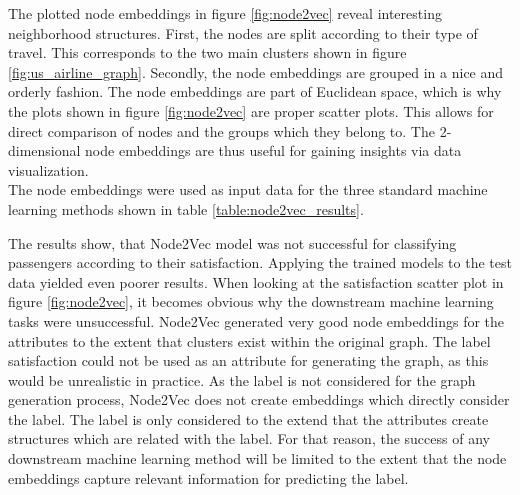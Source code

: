   \noindent The plotted node embeddings in figure \ref{fig:node2vec} reveal 
  interesting neighborhood structures. First, the nodes are split according to
  their type of travel. This corresponds to the two main clusters shown in
  figure \ref{fig:us_airline_graph}. Secondly, the node embeddings are grouped 
  in a nice and orderly fashion. The node embeddings are part of Euclidean
  space, which is why the plots shown in figure \ref{fig:node2vec} are proper
  scatter plots. This allows for direct comparison of nodes and the groups
  which they belong to. The 2-dimensional node embeddings are thus useful for
  gaining insights via data visualization.\\

  \noindent The node embeddings were used as input data for the three standard 
  machine learning methods shown in table \ref{table:node2vec_results}.

  \begin{table}[h]
    \centering
    \caption{Node2Vec Classification Results}
    \label{table:node2vec_results}
  \end{table}

  \noindent The results show, that Node2Vec model was not successful for
  classifying passengers according to their satisfaction. Applying the trained
  models to the test data yielded even poorer results. When looking at the
  satisfaction scatter plot in figure \ref{fig:node2vec}, it becomes obvious why
  the downstream machine learning tasks were unsuccessful. Node2Vec generated
  very good node embeddings for the attributes to the extent that clusters exist
  within the original graph. The label satisfaction could not be used as an 
  attribute for generating the graph, as this would be unrealistic in practice. 
  As the label is not considered for the graph generation process, Node2Vec 
  does not create embeddings which directly consider the label. The label is 
  only considered to the extend that the attributes create structures 
  which are related with the label. For that reason, the success of any 
  downstream machine learning method will be limited to the extent that the node 
  embeddings capture relevant information for predicting the label. \\

